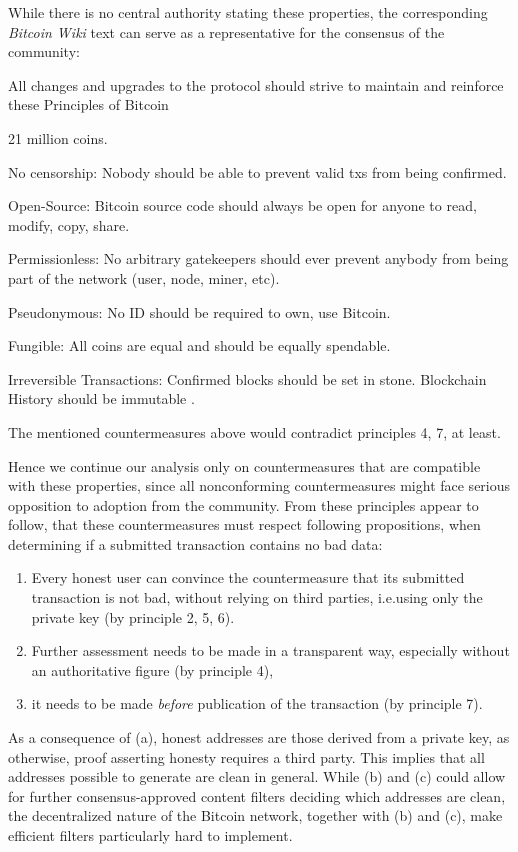 \documentclass[a4paper,11pt,titlepage]{scrbook}
\begin{document}
While there is no central authority stating these properties, the corresponding \emph{Bitcoin Wiki} text can serve as a representative for the consensus of the community:
\begin{displayquote}
    \noindent
    All changes and upgrades to the protocol should strive to maintain and reinforce these Principles of Bitcoin

    \begin{enumerate}[label={[}\arabic*.{]}]
        \item 21 million coins.
        \item No censorship: Nobody should be able to prevent valid txs from being confirmed.
        \item Open-Source: Bitcoin source code should always be open for anyone to read, modify, copy, share.
        \item Permissionless: No arbitrary gatekeepers should ever prevent anybody from being part of the network (user, node, miner, etc).
        \item Pseudonymous: No ID should be required to own, use Bitcoin.
        \item Fungible: All coins are equal and should be equally spendable.
        \item Irreversible Transactions: Confirmed blocks should be set in stone. Blockchain History should be immutable \cite{bitcoinwiki_principles_2017}.
    \end{enumerate}
\end{displayquote}
The mentioned countermeasures above would contradict principles 4, 7, at least.

Hence we continue our analysis only on countermeasures that are compatible with these properties,
since all nonconforming countermeasures might face serious opposition to adoption from the community.
From these principles appear to follow, that these countermeasures must respect following propositions, when determining if a submitted transaction contains no bad data:
\begin{enumerate}
    \item Every honest user can convince the countermeasure that its submitted transaction is not bad, without relying on third parties, i.e.\@ using only the private key (by principle 2, 5, 6).
    \item Further assessment needs to be made in a transparent way, especially without an authoritative figure (by principle 4),
    \item it needs to be made \emph{before} publication of the transaction (by principle 7).
\end{enumerate}
As a consequence of (a), honest addresses are those derived from a private key, as otherwise, proof asserting honesty requires a third party.
This implies that all addresses possible to generate are clean in general.
While (b) and (c) could allow for further consensus-approved content filters deciding which addresses are clean, the decentralized nature of the Bitcoin network, together with (b) and (c), make efficient filters particularly hard to implement.
\end{document}
